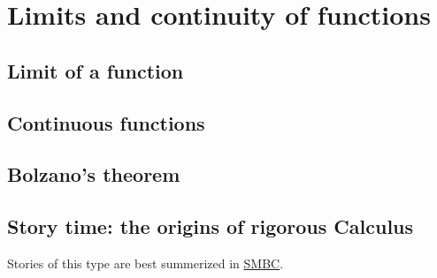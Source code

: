\documentclass[
	fontsize=10pt, %
	twoside=true, %
	secnumdepth=1, %
	numbers=noenddot, %
]{kaobook}
\begin{document}
\chapter{Limits and continuity of functions}

\section{Limit of a function}

\section{Continuous functions}

\section{Bolzano's theorem}

\section{Story time: the origins of rigorous Calculus}
Stories of this type are best summerized in \href{https://www.smbc-comics.com/comic/how-math-works}{SMBC}.















































\end{document}
